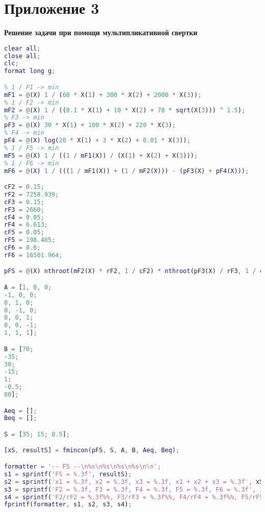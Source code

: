 \section*{Приложение 3} \label{p1:3}
\textbf{Решение задачи при помощи мультипликативной свертки}
\begin{lstlisting}[language={matlab}, caption={Решение задачи при помощи мультипликативной свертки}, label={lst:0}, basicstyle={\footnotesize\ttfamily}, breaklines={true}]
clear all;
close all; 
clc;
format long g;

% 1 / F1 -> min
mF1 = @(X) 1 / (60 * X(1) + 300 * X(2) + 2000 * X(3));
% 1 / F2 -> min
mF2 = @(X) 1 / ((0.1 * X(1) + 10 * X(2) + 70 * sqrt(X(3))) ^ 1.5);
% F3 -> min
pF3 = @(X) 30 * X(1) + 100 * X(2) + 220 * X(3);
% F4 -> min
pF4 = @(X) log(20 * X(1) + 3 * X(2) + 0.01 * X(3));
% 1 / F5 -> min
mF5 = @(X) 1 / ((1 / mF1(X)) / (X(1) + X(2) + X(3)));
% 1 / F6 -> min
mF6 = @(X) 1 / (((1 / mF1(X)) + (1 / mF2(X))) - (pF3(X) + pF4(X)));

cF2 = 0.15;
rF2 = 7258.939;
cF3 = 0.15;
rF3 = 2660;
cF4 = 0.05;
rF4 = 6.613;
cF5 = 0.05;
rF5 = 198.485;
cF6 = 0.6;
rF6 = 16501.964;

pFS = @(X) nthroot(mF2(X) * rF2, 1 / cF2) * nthroot(pF3(X) / rF3, 1 / cF3) * nthroot(pF4(X) / rF4, 1 / cF4) * nthroot(mF5(X) * rF5, 1 / cF5) * nthroot(mF6(X) * rF6, 1 / cF6);

A = [1, 0, 0;
-1, 0, 0;
0, 1, 0;
0, -1, 0;
0, 0, 1;
0, 0, -1;
1, 1, 1];

B = [70;
-35;
30;
-15;
1;
-0.5;
80];

Aeq = [];
Beq = [];

S = [35; 15; 0.5];

[xS, resultS] = fmincon(pFS, S, A, B, Aeq, Beq);

formatter = '-- FS --\n%s\n%s\n%s\n%s\n\n';
s1 = sprintf('FS = %.3f', resultS);
s2 = sprintf('x1 = %.3f, x2 = %.3f, x3 = %.3f, x1 + x2 + x3 = %.3f', xS, sum(xS));
s3 = sprintf('F2 = %.3f, F3 = %.3f, F4 = %.3f, F5 = %.3f, F6 = %.3f', 1 / mF2(xS), pF3(xS), pF4(xS), 1 / mF5(xS), 1 / mF6(xS));
s4 = sprintf('F2/rF2 = %.3f%%, F3/rF3 = %.3f%%, F4/rF4 = %.3f%%, F5/rF5 = %.3f%%, F6/rF6 = %.3f%%', (1 / mF2(xS)) / rF2 * 100, pF3(xS) / rF3 * 100, pF4(xS) / rF4 * 100, (1 / mF5(xS)) / rF5 * 100, (1 / mF6(xS)) / rF6 * 100);
fprintf(formatter, s1, s2, s3, s4);
\end{lstlisting}

